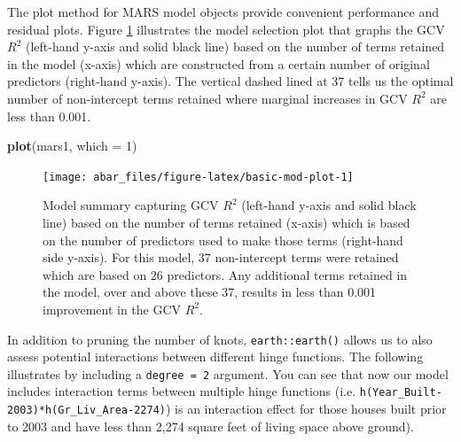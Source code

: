\documentclass[]{book}
\newenvironment{Shaded}{\begin{snugshade}}{\end{snugshade}}
\newcommand{\DataTypeTok}[1]{\textcolor[rgb]{0.13,0.29,0.53}{#1}}
\newcommand{\DecValTok}[1]{\textcolor[rgb]{0.00,0.00,0.81}{#1}}
\newcommand{\KeywordTok}[1]{\textcolor[rgb]{0.13,0.29,0.53}{\textbf{#1}}}
\newcommand{\NormalTok}[1]{#1}
\theoremstyle{definition}
\theoremstyle{definition}
\theoremstyle{definition}
\theoremstyle{remark}
\begin{document}
The plot method for MARS model objects provide convenient performance
and residual plots. Figure \ref{fig:basic-mod-plot} illustrates the
model selection plot that graphs the GCV \(R^2\) (left-hand y-axis and
solid black line) based on the number of terms retained in the model
(x-axis) which are constructed from a certain number of original
predictors (right-hand y-axis). The vertical dashed lined at 37 tells us
the optimal number of non-intercept terms retained where marginal
increases in GCV \(R^2\) are less than 0.001.

\begin{Shaded}
\begin{Highlighting}[]
\KeywordTok{plot}\NormalTok{(mars1, }\DataTypeTok{which =} \DecValTok{1}\NormalTok{)}
\end{Highlighting}
\end{Shaded}

\begin{figure}

{\centering \texttt{[image: abar\_files/figure-latex/basic-mod-plot-1]} 

}

\caption{Model summary capturing GCV $R^2$ (left-hand y-axis and solid black line) based on the number of terms retained (x-axis) which is based on the number of predictors used to make those terms (right-hand side y-axis). For this model, 37 non-intercept terms were retained which are based on 26 predictors.  Any additional terms retained in the model, over and above these 37, results in less than 0.001 improvement in the GCV $R^2$.}\label{fig:basic-mod-plot}
\end{figure}

In addition to pruning the number of knots, \texttt{earth::earth()}
allows us to also assess potential interactions between different hinge
functions. The following illustrates by including a
\texttt{degree\ =\ 2} argument. You can see that now our model includes
interaction terms between multiple hinge functions (i.e.
\texttt{h(Year\_Built-2003)*h(Gr\_Liv\_Area-2274)}) is an interaction
effect for those houses built prior to 2003 and have less than 2,274
square feet of living space above ground).
\end{document}
